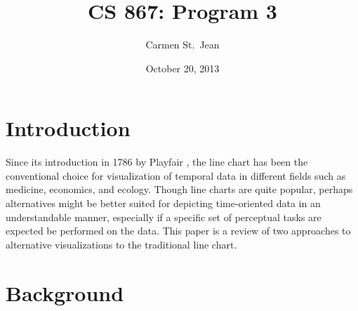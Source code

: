 \documentclass{article} %
\begin{document}
\title{CS 867: Program 3}
\date{October 20, 2013}
\author{Carmen St.\ Jean}

\maketitle

\section{Introduction}

Since its introduction in 1786 by Playfair \cite{playfair1786}, the line chart has been the conventional choice for visualization of temporal data in different fields such as medicine, economics, and ecology.  Though line charts are quite popular, perhaps alternatives might be better suited for depicting time-oriented data in an understandable manner, especially if a specific set of perceptual tasks are expected be performed on the data.  This paper is a review of two approaches to alternative visualizations to the traditional line chart.

\section{Background}
\end{document}
